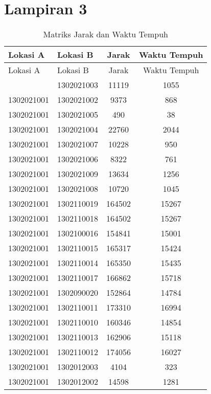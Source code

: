 \chapter*{Lampiran 3}


\begin{longtable}[h]{llcc}
	\caption{Matriks Jarak dan Waktu Tempuh}
	\label{tbl:distance_duration_matrix_full}\\
	\toprule
		Lokasi A & Lokasi B & Jarak & Waktu Tempuh\\ 
	\midrule
	\endfirsthead
	\toprule
		Lokasi A & Lokasi B & Jarak & Waktu Tempuh\\ 
	\midrule
	\endhead
	\bottomrule
	\endfoot
		1302021001 & 1302021003 & 11119 & 1055\\
		1302021001 & 1302021002 & 9373 & 868\\
		1302021001 & 1302021005 & 490 & 38\\
		1302021001 & 1302021004 & 22760 & 2044\\
		1302021001 & 1302021007 & 10228 & 950\\
		1302021001 & 1302021006 & 8322 & 761\\
		1302021001 & 1302021009 & 13634 & 1256\\
		1302021001 & 1302021008 & 10720 & 1045\\
		1302021001 & 1302110019 & 164502 & 15267\\
		1302021001 & 1302110018 & 164502 & 15267\\
		1302021001 & 1302100016 & 154841 & 15001\\
		1302021001 & 1302110015 & 165317 & 15424\\
		1302021001 & 1302110014 & 165350 & 15435\\
		1302021001 & 1302110017 & 166862 & 15718\\
		1302021001 & 1302090020 & 152864 & 14784\\
		1302021001 & 1302110011 & 173310 & 16994\\
		1302021001 & 1302110010 & 160346 & 14854\\
		1302021001 & 1302110013 & 162906 & 15118\\
		1302021001 & 1302110012 & 174056 & 16027\\
		1302021001 & 1302012003 & 4104 & 323\\
		1302021001 & 1302012002 & 14598 & 1281\\

\end{longtable}
